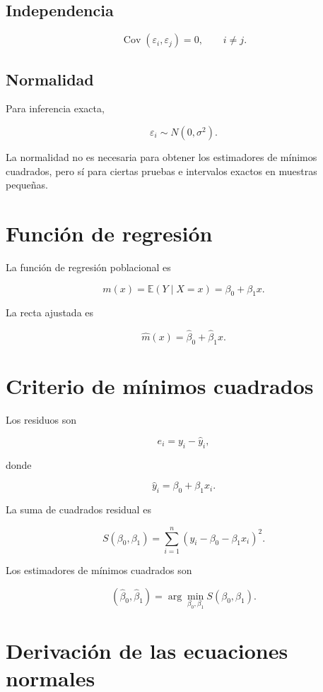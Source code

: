 \documentclass[
  spanish,
  11pt,
  letterpaper,
  DIV=11,
  numbers=noendperiod]{scrreprt}
\theoremstyle{definition}
\theoremstyle{plain}
\theoremstyle{definition}
\theoremstyle{remark}
\begin{document}
\subsection{Independencia}\label{independencia-1}

\[
\operatorname{Cov}(\varepsilon_i,\varepsilon_j)=0,
\qquad
i\neq j.
\]

\subsection{Normalidad}\label{normalidad}

Para inferencia exacta,

\[
\varepsilon_i
\sim
N(0,\sigma^2).
\]

La normalidad no es necesaria para obtener los estimadores de mínimos
cuadrados, pero sí para ciertas pruebas e intervalos exactos en muestras
pequeñas.

\section{Función de regresión}\label{funciuxf3n-de-regresiuxf3n}

La función de regresión poblacional es

\[
m(x)
=
\mathbb{E}(Y\mid X=x)
=
\beta_0+\beta_1x.
\]

La recta ajustada es

\[
\widehat{m}(x)
=
\widehat{\beta}_0
+
\widehat{\beta}_1x.
\]

\section{Criterio de mínimos
cuadrados}\label{criterio-de-muxednimos-cuadrados}

Los residuos son

\[
e_i
=
y_i
-
\widehat{y}_i,
\]

donde

\[
\widehat{y}_i
=
\beta_0+\beta_1x_i.
\]

La suma de cuadrados residual es

\[
S(\beta_0,\beta_1)
=
\sum_{i=1}^{n}
\left(
y_i-\beta_0-\beta_1x_i
\right)^2.
\]

Los estimadores de mínimos cuadrados son

\[
(\widehat{\beta}_0,\widehat{\beta}_1)
=
\arg\min_{\beta_0,\beta_1}
S(\beta_0,\beta_1).
\]

\section{Derivación de las ecuaciones
normales}\label{derivaciuxf3n-de-las-ecuaciones-normales}
\end{document}
